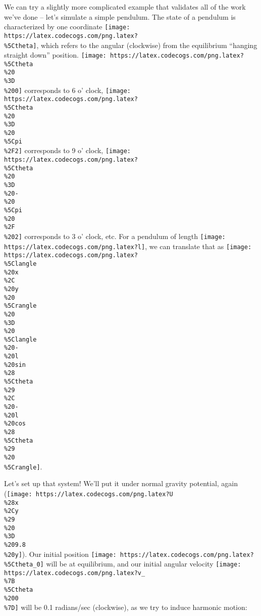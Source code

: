 \documentclass[]{article}
\begin{document}
We can try a slightly more complicated example that validates all of the work
we've done -- let's simulate a simple pendulum. The state of a pendulum is
characterized by one coordinate
\texttt{[image: https://latex.codecogs.com/png.latex?\\\%5Ctheta]}, which refers
to the angular (clockwise) from the equilibrium ``hanging straight down''
position.
\texttt{[image: https://latex.codecogs.com/png.latex?\\\%5Ctheta\\\%20\\\%3D\\\%200]}
corresponds to 6 o' clock,
\texttt{[image: https://latex.codecogs.com/png.latex?\\\%5Ctheta\\\%20\\\%3D\\\%20\\\%5Cpi\\\%2F2]}
corresponds to 9 o' clock,
\texttt{[image: https://latex.codecogs.com/png.latex?\\\%5Ctheta\\\%20\\\%3D\\\%20-\\\%20\\\%5Cpi\\\%20\\\%2F\\\%202]}
corresponds to 3 o' clock, etc. For a pendulum of length
\texttt{[image: https://latex.codecogs.com/png.latex?l]}, we can translate that
as
\texttt{[image: https://latex.codecogs.com/png.latex?\\\%5Clangle\\\%20x\\\%2C\\\%20y\\\%20\\\%5Crangle\\\%20\\\%3D\\\%20\\\%5Clangle\\\%20-\\\%20l\\\%20sin\\\%28\\\%5Ctheta\\\%29\\\%2C\\\%20-\\\%20l\\\%20cos\\\%28\\\%5Ctheta\\\%29\\\%20\\\%5Crangle]}.

Let's set up that system! We'll put it under normal gravity potential, again
(\texttt{[image: https://latex.codecogs.com/png.latex?U\\\%28x\\\%2Cy\\\%29\\\%20\\\%3D\\\%209.8\\\%20y]}).
Our initial position
\texttt{[image: https://latex.codecogs.com/png.latex?\\\%5Ctheta\_0]} will be at
equilibrium, and our initial angular velocity
\texttt{[image: https://latex.codecogs.com/png.latex?v\_\\\%7B\\\%5Ctheta\\\%200\\\%7D]}
will be 0.1 radians/sec (clockwise), as we try to induce harmonic motion:
\end{document}
